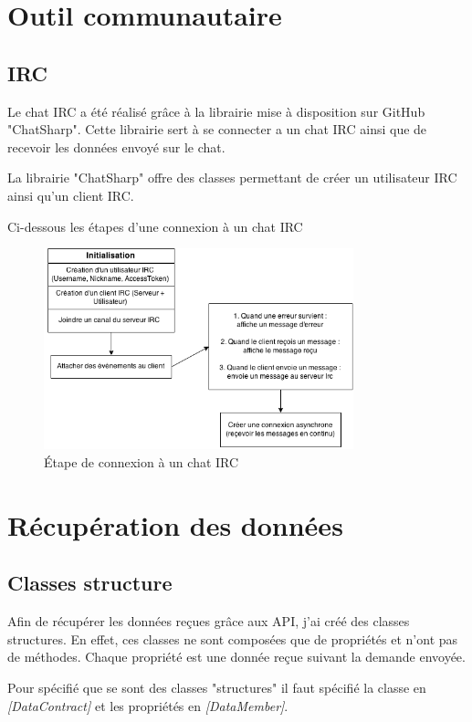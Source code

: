\documentclass[11pt]{report} %
\begin{document}
	\newpage
	\section{Outil communautaire}
		\subsection{IRC}
		Le chat IRC a été réalisé grâce à la librairie mise à disposition sur GitHub "ChatSharp". Cette librairie sert à se connecter a un chat IRC ainsi que de recevoir les données envoyé sur le chat.
		
		La librairie "ChatSharp" offre des classes permettant de créer un utilisateur IRC ainsi qu'un client IRC. 
		
		Ci-dessous les étapes d'une connexion à un chat IRC
		
		\begin{figure}[h]
			\center
			\includegraphics[width=0.8\textwidth]{../img/IrcChat.png}
			\caption{Étape de connexion à un chat IRC}
			\label{IrcChat}
		\end{figure}

	\newpage
	\section{Récupération des données}
		\subsection{Classes structure}
		Afin de récupérer les données reçues grâce aux API, j'ai créé des classes structures. En effet, ces classes ne sont composées que de propriétés et n'ont pas de méthodes. Chaque propriété est une donnée reçue suivant la demande envoyée.
		
		Pour spécifié que se sont des classes "structures" il faut spécifié la classe en \textit{[DataContract]} et les propriétés en \textit{[DataMember]}.
		
\end{document}
